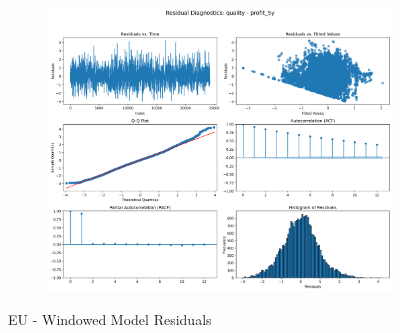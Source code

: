 \documentclass[11pt,english,a4paper,hidelinks]{book}
\begin{document}
\begin{figure}[H]
\begin{subfigure}[b]{0.32\textwidth}
    \end{subfigure}
    \hfill
    \begin{subfigure}[b]{0.32\textwidth}
        \centering
        \includegraphics[width=\textwidth]{images/code/models/linear_regression/third_model/EU/quality_profit_5y_residuals.png}
    \end{subfigure}
    \caption{EU - Windowed Model Residuals}
    \label{fig:linear_regression_EU_residues_windowed}
\end{figure}
\end{document}
